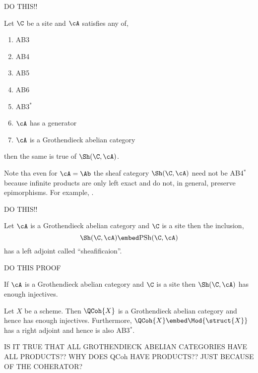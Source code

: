 \documentclass[12pt]{article}
\begin{document}
DO THIS!!

\begin{theorem}
Let $\C$ be a site and $\cA$ satisfies any of,
\begin{enumerate}
\item AB3
\item AB4
\item AB5
\item AB6
\item AB3$^*$
\item $\cA$ has a generator
\item $\cA$ is a Grothendieck abelian category
\end{enumerate}
then the same is true of $\Sh(\C, \cA)$.
\end{theorem}

\begin{rmk}
Note tha even for $\cA = \Ab$ the sheaf category $\Sh(\C, \cA)$ need not be AB4$^*$ because infinite products are only left exact and do not, in general, preserve epimorphisms. For example, .
\end{rmk}

DO THIS!!

\begin{theorem}
Let $\cA$ is a Grothendieck abelian category and $\C$ is a site then the inclusion,
\[ \Sh(\C, \cA) \embed \PSh(\C, \cA) \]
has a left adjoint called ``sheafificaion''. 
\end{theorem}

DO THIS PROOF

\begin{cor}
If $\cA$ is a Grothendieck abelian category and $\C$ is a site then $\Sh(\C, \cA)$ has enough injectives. 
\end{cor}

\begin{theorem}
Let $X$ be a scheme. Then $\QCoh{X}$ is a Grothendieck abelian category and hence has enough injectives. Furthermore, $\QCoh{X} \embed \Mod{\struct{X}}$ has a right adjoint and hence is also AB3$^*$. 
\end{theorem}

IS IT TRUE THAT ALL GROTHENDIECK ABELIAN CATEGORIES HAVE ALL PRODUCTS?? WHY DOES QCoh HAVE PRODUCTS?? JUST BECAUSE OF THE COHERATOR?
\end{document}

